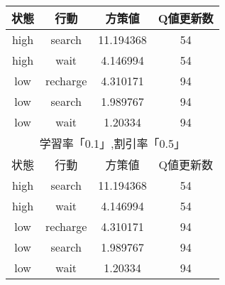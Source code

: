 \begin{table}
\begin{minipage}[r]{0.45\hsize}
\begin{tabular}{|c|c|c|c|}
      \hline
      状態 & 行動 & 方策値 & Q値更新数\\
      \hline
      high & search & 11.194368 & 54 \\
      high & wait & 4.146994 & 54 \\
      low & recharge & 4.310171 & 94 \\
      low & search & 1.989767 & 94 \\
      low & wait & 1.20334 & 94 \\
      \hline\hline
      \multicolumn{4}{|c|}{学習率「0.1」,割引率「0.5」} \\
      \hline
      状態 & 行動 & 方策値 & Q値更新数\\
      \hline
      high & search & 11.194368 & 54 \\
      high & wait & 4.146994 & 54 \\
      low & recharge & 4.310171 & 94 \\
      low & search & 1.989767 & 94 \\
      low & wait & 1.20334 & 94 \\
      \hline
    \end{tabular}
  \end{minipage}
\end{table}